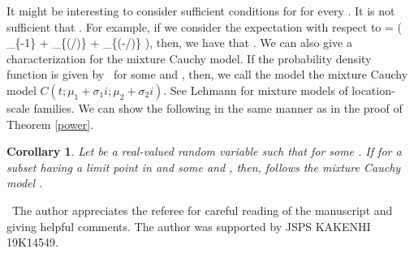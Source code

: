 \documentclass{amsart}
\newtheorem{Cor}{Corollary}
\theoremstyle{definition}
\begin{document}
It might be
interesting to consider sufficient conditions for   for every  .
It is not sufficient that  .
For example, if we consider the expectation with respect to
 \mu =  \left( \delta_{\{-1\}} + \delta_{\{\exp(\pi/)\}} + \delta_{\{\exp(-\pi/)\}}
\right), 
then, we have that  .
We can also give a characterization for the mixture Cauchy model.
If the probability density function is given by
\ for some   and  ,
then, we call the model the mixture Cauchy model $C\left(t; \mu_1 + \sigma_1 i;
\mu_2 + \sigma_2 i\right)$.
See Lehmann \cite{Lehmann1999} for mixture models of location-scale families.
We can show the following in the same manner as in the proof of Theorem \ref{power}.
\begin{Cor}
Let   be a real-valued random variable such that  
for some  .
If   for
a subset   having a limit point in   and some   and  ,
then,   follows the mixture Cauchy model  .
\end{Cor}
 \ The author appreciates the referee for careful reading of the manuscript and giving helpful comments.
The author was supported by JSPS KAKENHI
19K14549.


\end{document}
